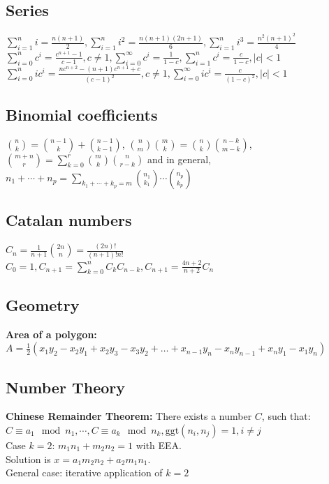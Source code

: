 \documentclass[10pt,a4paper,ngerman,oneside,]{article}
\begin{document}
\begin{multicols}{2}
\subsection{Series}
$
\sum\limits_{i=1}^{n}i=\frac{n(n+1)}{2}, \sum\limits_{i=1}^{n}i^2=\frac{n(n+1)(2n+1)}{6}, \sum\limits_{i=1}^{n}i^3=\frac{n^2(n+1)^2}{4}
$\\
$
\sum\limits_{i=0}^{n}c^i=\frac{c^{n+1}-1}{c-1},c\neq 1, \sum\limits_{i=0}^{\infty}c^i=\frac{1}{1-c}, \sum\limits_{i=1}^{n}c^i=\frac{c}{1-c},|c|<1
$\\
$
\sum\limits_{i=0}^{n}ic^i=\frac{nc^{n+2}-(n+1)c^{n+1}+c}{(c-1)^2}, c\neq 1, \sum\limits_{i=0}^{\infty}ic^i=\frac{c}{(1-c)^2}, |c|<1
$

\subsection{Binomial coefficients}
$
{n \choose k} = {n-1 \choose k} + {n-1 \choose k-1}
$,
$
{n \choose m}{m \choose k} = {n \choose k}{n-k \choose m-k}
$,
$
{m+n \choose r} = \sum_{k=0}^r {m \choose k}{n \choose r-k}
$ and in general,
$
{n_1 + \cdots + n_p} = \sum_{k_1 + \cdots + k_p = m} {n_1 \choose k_1}
\cdots {n_p \choose k_p}
$
\subsection{Catalan numbers}
$
C_n=\frac{1}{n+1}\binom{2n}{n}=\frac{(2n)!}{(n+1)!n!}
$\\
$
C_0=1, C_{n+1}=\sum\limits_{k=0}^{n}C_kC_{n-k}, C_{n+1}=\frac{4n+2}{n+2}C_n
$

\subsection{Geometry}
\textbf{Area of a polygon:} $A=\frac{1}{2}(x_1y_2-x_2y_1+x_2y_3-x_3y_2+\dots+x_{n-1}y_n-x_ny_{n-1}+x_ny_1-x_1y_n)$


\subsection{Number Theory}
\textbf{Chinese Remainder Theorem:} There exists a number $C$, such that:\\
$
C\equiv a_1\mod n_1,\cdots, C\equiv a_k\mod n_k, \mathrm{ggt}(n_i,n_j)=1,i\neq j
$\\
Case $k=2$: $m_1n_1+m_2n_2=1$ with EEA.\\
Solution is $x=a_1m_2n_2+a_2m_1n_1$.\\
General case: iterative application of $k=2$


\end{multicols}
\end{document}
